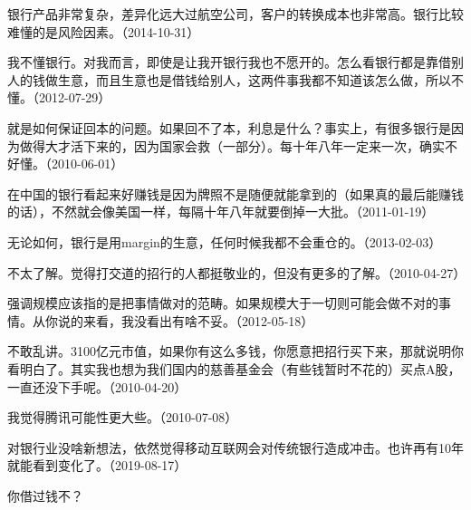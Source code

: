 银行产品非常复杂，差异化远大过航空公司，客户的转换成本也非常高。银行比较难懂的是风险因素。（2014-10-31）

我不懂银行。对我而言，即使是让我开银行我也不愿开的。怎么看银行都是靠借别人的钱做生意，而且生意也是借钱给别人，这两件事我都不知道该怎么做，所以不懂。（2012-07-29）


就是如何保证回本的问题。如果回不了本，利息是什么？事实上，有很多银行是因为做得大才活下来的，因为国家会救（一部分）。每十年八年一定来一次，确实不好懂。（2010-06-01）


在中国的银行看起来好赚钱是因为牌照不是随便就能拿到的（如果真的最后能赚钱的话），不然就会像美国一样，每隔十年八年就要倒掉一大批。（2011-01-19）

无论如何，银行是用margin的生意，任何时候我都不会重仓的。（2013-02-03）


不太了解。觉得打交道的招行的人都挺敬业的，但没有更多的了解。（2010-04-27）


强调规模应该指的是把事情做对的范畴。如果规模大于一切则可能会做不对的事情。从你说的来看，我没看出有啥不妥。（2012-05-18）


不敢乱讲。3100亿元市值，如果你有这么多钱，你愿意把招行买下来，那就说明你看明白了。其实我也想为我们国内的慈善基金会（有些钱暂时不花的）买点A股，一直还没下手呢。（2010-04-20）


我觉得腾讯可能性更大些。（2010-07-08）

对银行业没啥新想法，依然觉得移动互联网会对传统银行造成冲击。也许再有10年就能看到变化了。（2019-08-17）


你借过钱不？


